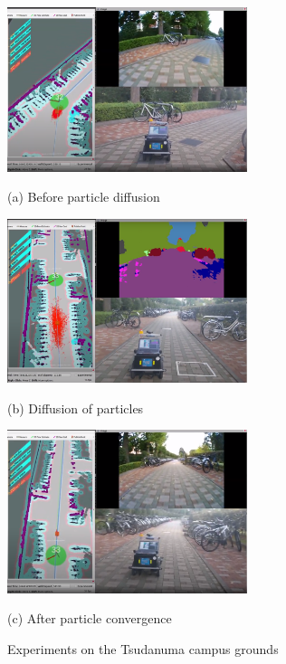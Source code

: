 \documentclass[uplatex, twocolumn, 9pt]{jsproceedings}
\begin{document}
\begin{figure}[h]
  \centering
  \begin{minipage}[b]{1\linewidth}
    \centering
    \includegraphics[width=70mm]{fig/switch-mode1.pdf}
    \caption*{(a) Before particle diffusion}
  \end{minipage} 
  \hspace{0.03\columnwidth}
  \begin{minipage}[b]{1\linewidth}
    \centering
    \includegraphics[width=70mm]{fig/switch-mode2.pdf}
    \caption*{(b) Diffusion of particles}
  \end{minipage}
  \begin{minipage}[b]{1\linewidth}
    \centering
    \includegraphics[width=70mm]{fig/switch-mode3.pdf}
    \caption*{(c) After particle convergence}
  \end{minipage}
  \caption{Experiments on the Tsudanuma campus grounds}
  \label{fig:switch-mode}%
\end{figure}

\end{document}
